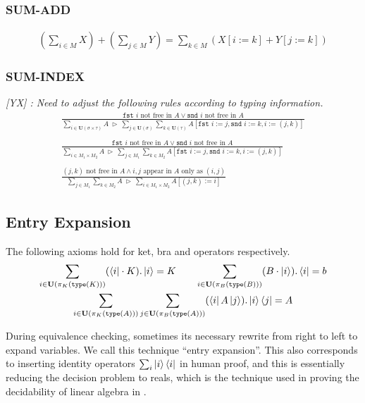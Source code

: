 \documentclass[manuscript, review, timestamp]{acmart}
\newcommand{\yx}[1]{\textit{\color{blue}[YX] : #1}}
\newcommand*{\type}{\texttt{type}}
\newcommand*{\fst}{\texttt{fst }}
\newcommand*{\snd}{\texttt{snd }}
\newcommand*{\reduce}{\ \triangleright\ }
\begin{document}
\subsubsection*{SUM-ADD}
\begin{gather*}
  (\sum_{i \in M} X) + (\sum_{j \in M} Y) = \sum_{k \in M} (X[i:=k] + Y[j:=k])
\end{gather*}

\subsubsection*{SUM-INDEX}
\yx{Need to adjust the following rules according to typing information.}
\begin{gather*}
  \frac{\fst i \text{ not free in } A \vee \snd i \text{ not free in } A}{\sum_{i\in\mathbf{U}(\sigma \times \tau)}A \reduce \sum_{j\in\mathbf{U}(\sigma)}\sum_{k\in\mathbf{U}(\tau)}A[\fst i:=j, \snd i:=k, i:=(j,k)]}
  \\
  \\
  \frac{\fst i \text{ not free in } A \vee \snd i \text{ not free in } A}{\sum_{i\in M_1 \times M_2}A \reduce \sum_{j\in M_1}\sum_{k\in M_2}A[\fst i:=j, \snd i:=k, i:=(j,k)]}
  \\
  \\
  \frac{(j, k) \text{ not free in } A \wedge i, j \text{ appear in } A \text{ only as } (i, j)}{\sum_{j\in M_1}\sum_{k\in M_2}A \reduce \sum_{i\in M_1\times M_2}A[(j,k):=i]}
\end{gather*}

\subsection{Entry Expansion}

The following axioms hold for ket, bra and operators respectively. 
\begin{gather*}
  \sum_{i \in \mathbf{U}(\pi_K(\type(K)))} (\bra{i} \cdot K).\ket{i} = K
  \qquad
  \sum_{i \in \mathbf{U}(\pi_B(\type(B)))} (B \cdot \ket{i}).\bra{i} = b
  \\
  \sum_{i \in \mathbf{U}(\pi_K(\type(A)))} \sum_{j \in \mathbf{U}(\pi_B(\type(A)))} (\bra{i} A \ket{j}).\ket{i}\bra{j} = A
\end{gather*}

During equivalence checking, sometimes its necessary rewrite from right to left to expand variables. We call this technique ``entry expansion''. This also corresponds to inserting identity operators $\sum_{i}\ket{i}\bra{i}$ in human proof, and this is essentially reducing the decision problem to reals, which is the technique used in proving the decidability of linear algebra in \cite{Solovay2012}.
\end{document}
